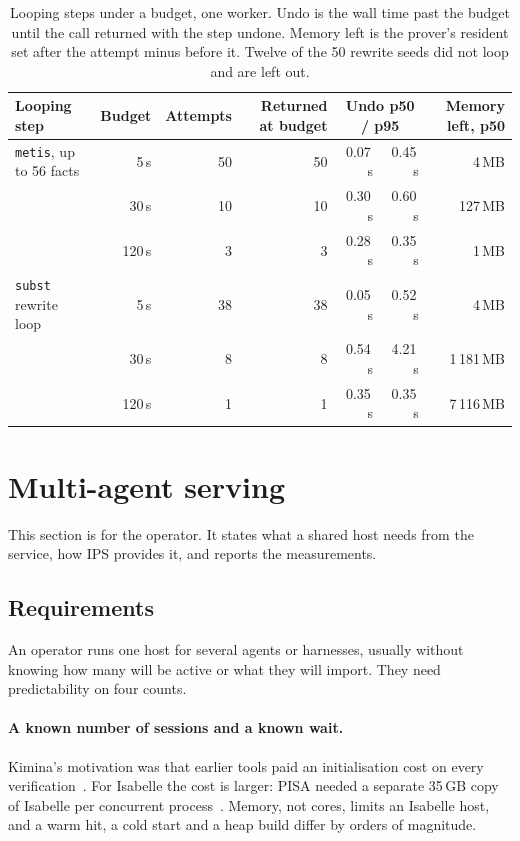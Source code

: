 \documentclass[11pt]{article}
\newcommand{\code}[1]{\colorbox{gray!12}{\texttt{\vphantom{Ag}#1}}}
\begin{document}
\begin{table}[!htb]
\centering\small
\begin{tabular}{@{}l r r r rr r@{}}
\toprule
Looping step & Budget & Attempts & Returned at budget & \multicolumn{2}{c}{Undo p50 / p95} & Memory left, p50 \\
\midrule
\code{metis}, up to 56 facts & 5\,s & 50 & 50 & 0.07\,s & 0.45\,s & 4\,MB \\
 & 30\,s & 10 & 10 & 0.30\,s & 0.60\,s & 127\,MB \\
 & 120\,s & 3 & 3 & 0.28\,s & 0.35\,s & 1\,MB \\
\code{subst} rewrite loop & 5\,s & 38 & 38 & 0.05\,s & 0.52\,s & 4\,MB \\
 & 30\,s & 8 & 8 & 0.54\,s & 4.21\,s & 1\,181\,MB \\
 & 120\,s & 1 & 1 & 0.35\,s & 0.35\,s & 7\,116\,MB \\
\bottomrule
\end{tabular}
\caption{Looping steps under a budget, one worker. Undo is the wall
  time past the budget until the call returned with the step undone.
  Memory left is the prover's resident set after the attempt minus before
  it. Twelve of the 50 rewrite seeds did not loop and are left out.}
\label{tab:bounded}
\end{table}

\section{Multi-agent serving}
\label{sec:serving}

This section is for the operator. It states what a shared host needs
from the service, how IPS provides it, and reports the measurements.

\subsection{Requirements}

An operator runs one host for several agents or harnesses, usually
without knowing how many will be active or what they will import. They
need predictability on four counts.

\paragraph{A known number of sessions and a known wait.} Kimina's
motivation was that earlier tools paid an initialisation cost on every
verification~\cite{santos2025kimina}. For Isabelle the cost is larger:
PISA needed a separate 35\,GB copy of Isabelle per concurrent
process~\cite{jiang2021lisa}. Memory, not cores, limits an Isabelle host,
and a warm hit, a cold start and a heap build differ by orders of
magnitude.
\end{document}
